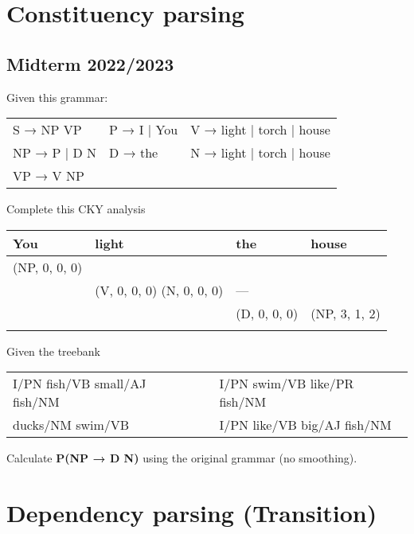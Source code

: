 \documentclass[11pt, a4paper]{article}
\begin{document}
\section{Constituency parsing}

\subsection{Midterm 2022/2023}

Given this grammar:
\begin{center}
	\begin{tabular}{|lll|}
		\hline
		S → NP  VP & P → I | You & V → light | torch | house \\
		NP → P | D N & D → the & N → light | torch | house \\
		VP → V NP & &\\
		\hline
	\end{tabular}
\end{center}

Complete this CKY analysis
\begin{center}
	\begin{tabular}{|p{2cm}|p{2cm}|p{2cm}|p{2cm}|}
		\hline
		You & light & the & house \\
		\hline
		(NP, 0, 0, 0) &&& \\
		\hline
		\multicolumn{1}{l|}{} & (V, 0, 0, 0) \newline (N, 0, 0, 0) & --- & \\
		\cline{2-4}
		\multicolumn{2}{l|}{} & (D, 0, 0, 0) & (NP, 3, 1, 2) \\
		\cline{3-4}
		\multicolumn{3}{l|}{} & \\
		\cline{4-4}
	\end{tabular}
\end{center}

Given the treebank
\begin{center}
	\begin{tabular}{|lll|}
		\hline
		I/PN fish/VB small/AJ fish/NM &&
		I/PN swim/VB like/PR fish/NM \\
		ducks/NM swim/VB &&
		I/PN like/VB big/AJ fish/NM \\
		\hline
	\end{tabular}
\end{center}
Calculate \textbf{P(NP → D N)} using the original grammar (no smoothing).

\section{Dependency parsing (Transition)} 
\end{document}
